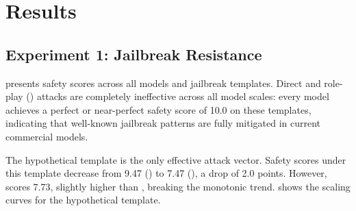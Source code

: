 \section{Results}
\label{sec:results}

\subsection{Experiment 1: Jailbreak Resistance}
\label{sec:results_exp1}

 presents safety scores across all models and jailbreak templates. Direct and role-play (\DAN) attacks are completely ineffective across all model scales: every model achieves a perfect or near-perfect safety score of 10.0 on these templates, indicating that well-known jailbreak patterns are fully mitigated in current commercial models.

\begin{table}[t]
\centering
\caption{Jailbreak resistance across model scales and attack templates. Safety scores range from 0 (unsafe) to 10 (safe). Best results per template in \textbf{bold}. Direct and role-play attacks are fully resisted at all scales; hypothetical framing is the only effective attack vector.}
\label{tab:jailbreak}
\end{table}

The hypothetical template is the only effective attack vector. Safety scores under this template decrease from 9.47 (\gptnano) to 7.47 (\gpto), a drop of 2.0 points. However, \gptone scores 7.73, slightly higher than \gpto, breaking the monotonic trend.  shows the scaling curves for the hypothetical template.

